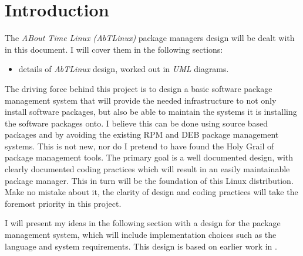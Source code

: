 \section{Introduction}  
The \emph{ABout Time Linux (AbTLinux)} package managers design will be dealt with in
this document. I will cover them in the following sections:

\begin{itemize}
  \item details of \emph{AbTLinux} design, worked out in \emph{UML} diagrams.
\end{itemize}

The driving force behind this project is to design a basic software package management system that will provide the needed infrastructure to not only install software packages, but also be able to maintain the systems it is installing the software packages onto. I believe this can be done using source based packages and by avoiding the existing RPM and DEB package management systems. This is not new, nor do I pretend to have found the Holy Grail of package management tools. The primary goal is a well documented design, with clearly documented coding practices which will result in an easily maintainable package manager. This in turn will be the foundation of this Linux distribution. Make no mistake about it, the clarity of design and coding practices will take the foremost priority in this project.

I will present my ideas in the following section with a design for the package management system, which will include implementation choices such as the language and system requirements. This design is based on earlier work in \cite{2006-Schabell-LinuxRequirements}.
